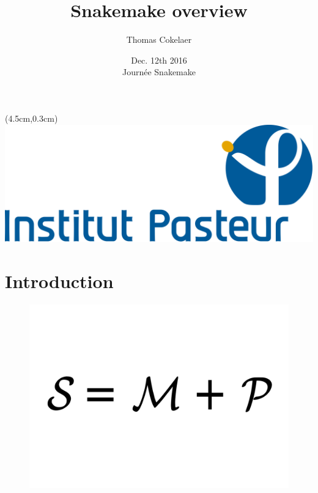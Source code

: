 \documentclass{beamer}
\title{Snakemake overview}
\author[T.Cokelaer]{Thomas Cokelaer}
\institute{Institut Pasteur}
\date{Dec. 12th 2016\\ Journée Snakemake}
\begin{document}

\begin{frame}[plain]
    \titlepage
    \begin{textblock*}{5cm}(4.5cm,0.3cm)
        \includegraphics[scale=0.09]{images/Institut_Pasteur.png}
    \end{textblock*}
\end{frame}


\section{Introduction}

\begin{frame}[plain]
  \begin{figure}
      \centering
      \includegraphics[scale=0.2]{images/equation.png}
  \end{figure}
\end{frame}
\end{document}
